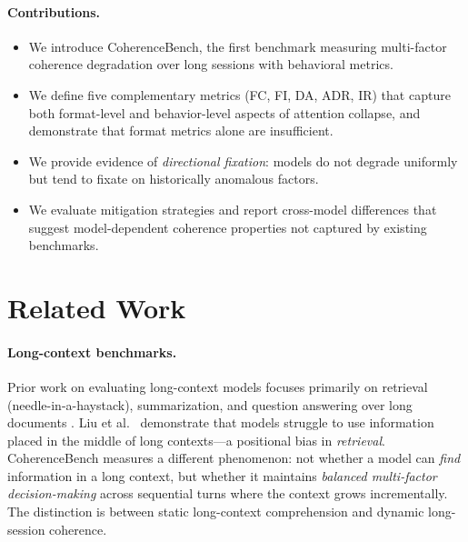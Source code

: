 \documentclass{article}
\begin{document}
\paragraph{Contributions.}
\begin{itemize}
    \item We introduce CoherenceBench, the first benchmark measuring
    multi-factor coherence degradation over long sessions with behavioral
    metrics.
    \item We define five complementary metrics (FC, FI, DA, ADR, IR) that
    capture both format-level and behavior-level aspects of attention
    collapse, and demonstrate that format metrics alone are insufficient.
    \item We provide evidence of \emph{directional fixation}: models do
    not degrade uniformly but tend to fixate on historically anomalous
    factors.
    \item We evaluate mitigation strategies and report cross-model
    differences that suggest model-dependent coherence properties not
    captured by existing benchmarks.
\end{itemize}

\section{Related Work}
\label{sec:related}

\paragraph{Long-context benchmarks.}
Prior work on evaluating long-context models focuses primarily on
retrieval (needle-in-a-haystack), summarization, and question answering
over long documents \cite{kamradt2023needle, liu2024lost}. Liu et
al.~\cite{liu2024lost} demonstrate that models struggle to use
information placed in the middle of long contexts---a positional bias in
\emph{retrieval}. CoherenceBench measures a different phenomenon: not
whether a model can \emph{find} information in a long context, but
whether it maintains \emph{balanced multi-factor decision-making} across
sequential turns where the context grows incrementally. The distinction
is between static long-context comprehension and dynamic long-session
coherence.
\end{document}
